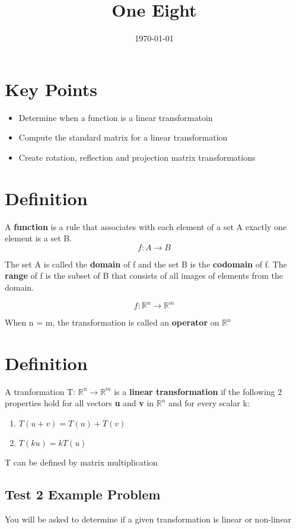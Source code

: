 \documentclass[11pt]{article}
\date{\today}
\title{One Eight}
\begin{document}
\maketitle
\tableofcontents

\section{Key Points}
\label{sec:org55874a8}
\begin{itemize}
\item Determine when a function is a linear transformatoin
\item Compute the standard matrix for a linear transformation
\item Create rotation, reflection and projection matrix transformations
\end{itemize}
\section{Definition}
\label{sec:orge653e0c}
A \textbf{function} is a rule that associates with each element of a set A exactly one element is a set B.
\[
f: A \rightarrow{} B
\]

The set A is called the \textbf{domain} of f and the set B is the \textbf{codomain} of f. The \textbf{range} of f is the subset of B that consists of all images of elements from the domain.

\[
f: \mathbb{R}^{n} \rightarrow{} \mathbb{R}^{m}
\]

When n = m, the transformation is called an \textbf{operator} on \(\mathbb{R}^{n}\)
\section{Definition}
\label{sec:orgf3816ec}
A tranformation T: \(\mathbb{R}^{n} \rightarrow{} \mathbb{R}^{m}\) is a \textbf{linear transformation} if the following 2 properties hold for all vectors \textbf{u} and \textbf{v} in \(\mathbb{R}^{n}\) and for every scalar k:

\begin{enumerate}
\item \(T(u+v) = T(u) + T(v)\)
\item \(T(ku) = kT(u)\)
\end{enumerate}

T can be defined by matrix multiplication
\subsection{Test 2 Example Problem}
\label{sec:orgd57fa31}
You will be asked to determine if a given transformation is linear or non-linear
\end{document}
